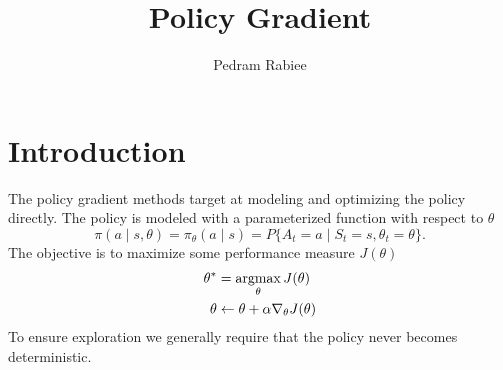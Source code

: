\documentclass{article}
\title{Policy Gradient}
\author{Pedram Rabiee}
\begin{document}
\begin{titlepage}
\thispagestyle{empty}
\maketitle

\tableofcontents

\end{titlepage}



\section{Introduction}
The policy gradient methods target at modeling and optimizing the policy directly. The policy is modeled with a parameterized function with respect to $\theta$
\begin{equation*}
    \pi(a \mid s,\theta) = \pi_\theta(a \mid s) = P\{A_t = a \mid S_t = s,\theta_t = \theta\}.
\end{equation*}
The objective is to maximize some performance measure $J(\theta)$
\begin{align*}
    \theta^* &= \operatorname*{argmax}_\theta J(\theta)\\
    \theta &\gets \theta + \alpha \nabla_\theta J(\theta)
\end{align*}
To ensure exploration we generally require that the policy never becomes deterministic.
\end{document}
